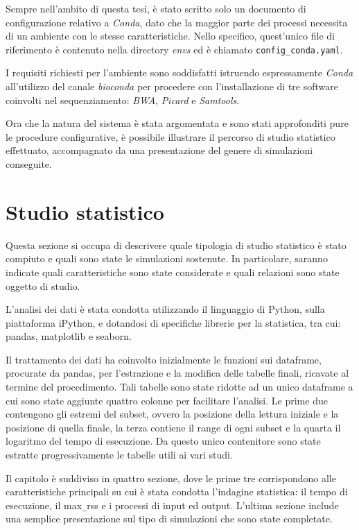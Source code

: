 Sempre nell'ambito di questa tesi, è stato scritto solo un documento di configurazione relativo a \textit{Conda}, dato che la maggior parte dei processi necessita di un ambiente con le stesse caratteristiche.
Nello specifico, quest'unico file di riferimento è contenuto nella directory \textit{envs} ed è chiamato \verb!config_conda.yaml!.

I requisiti richiesti per l'ambiente sono soddisfatti istruendo espressamente \textit{Conda} all'utilizzo del canale \textit{bioconda} per procedere con l'installazione di tre software coinvolti nel sequenziamento: \textit{BWA}, \textit{Picard} e \textit{Samtools}.

Ora che la natura del sistema è stata argomentata e sono stati approfonditi pure le procedure configurative, è possibile illustrare il percorso di studio statistico effettuato, accompagnato da una presentazione del genere di simulazioni conseguite.

\section{Studio statistico}
Questa sezione si occupa di descrivere quale tipologia di studio statistico è stato compiuto e quali sono state le simulazioni sostenute. 
In particolare, saranno indicate quali caratteristiche sono state considerate e quali relazioni sono state oggetto di studio.     

L'analisi dei dati è stata condotta utilizzando il linguaggio di Python, sulla piattaforma iPython, e dotandosi di specifiche librerie per la statistica, tra cui: pandas, matplotlib e seaborn.

Il trattamento dei dati ha coinvolto inizialmente le funzioni sui dataframe, procurate da pandas, per l'estrazione e la modifica delle tabelle finali, ricavate al termine del procedimento.
Tali tabelle sono state ridotte ad un unico dataframe a cui sono state aggiunte quattro colonne per facilitare l'analisi. 
Le prime due contengono gli estremi del subset, ovvero la posizione della lettura iniziale e la posizione di quella finale, la terza contiene il range di ogni subset e la quarta il logaritmo del tempo di esecuzione.
Da questo unico contenitore sono state estratte progressivamente le tabelle utili ai vari studi.

Il capitolo è suddiviso in quattro sezione, dove le prime tre corrispondono alle caratteristiche principali su cui è stata condotta l'indagine statistica: il tempo di esecuzione, il max\verb!_!rss e i processi di input ed output. 
L'ultima sezione include una semplice presentazione sul tipo di simulazioni che sono state completate.



